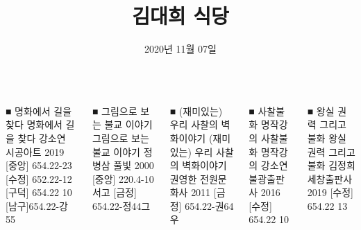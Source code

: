 \documentclass[	20pt, 
							a1paper, 
							landscape, %
							margin=0mm, %
							innermargin=10mm,  		%
							blockverticalspace=4mm, %
							colspace=5mm, 
							subcolspace=0mm
							]{tikzposter}
\title{김대희 식당}
\author{ 2020년 
				11월
				07일  }
\begin{document}
	\maketitle

	\begin{columns}





			\block 
			{■  명화에서 길을 찾다 }
			{				
			명화에서 길을 찾다 강소연 시공아트 2019
			[중앙] 654.22-23
			[수정] 652.22-12
			[구덕] 654.22 10
			[남구]654.22-강55
			}


			\block 
			{■  그림으로 보는 불교 이야기 }
			{				
			그림으로 보는 불교 이야기 정병삼 풀빛 2000
			[중앙] 220.4-10 서고
			[금정] 654.22-정44그
			}

			\block
			{■  (재미있는) 우리 사찰의 벽화이야기 }
			{				
			(재미있는) 우리 사찰의 벽화이야기 권영한 전원문화사 2011
			[금정] 654.22-권64우
			}

			\block
			{■  사찰불화 명작강의 }
			{				
			사찰불화 명작강의 강소연 불광출판사 2016 
			[수정] 654.22 10
			}

			\block
			{■  왕실 권력 그리고 불화 }
			{				
			왕실 권력 그리고 불화  김정희 세창출판사 2019
			[수정] 654.22 13
			}






\end{columns}
\end{document}
